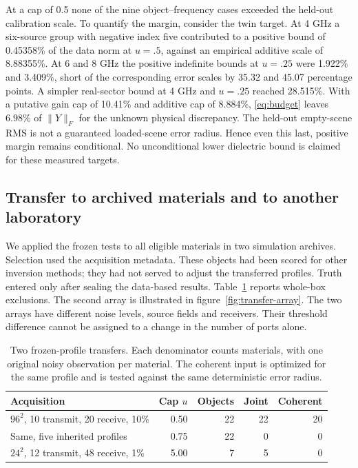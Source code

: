\documentclass[anonymous,12pt]{iopjournal}
\theoremstyle{remark}\newtheorem{remark}[theorem]{Remark}
\numberwithin{equation}{section}
\begin{document}
At a cap of 0.5 none of the nine object--frequency cases exceeded the held-out calibration scale. To quantify the margin, consider the twin target. At 4 GHz a six-source group with negative index five contributed to a positive bound of 0.45358\% of the data norm at $u=.5$, against an empirical additive scale of 8.88355\%. At 6 and 8 GHz the positive indefinite bounds at $u=.25$ were 1.922\% and 3.409\%, short of the corresponding error scales by 35.32 and 45.07 percentage points. A simpler real-sector bound at 4 GHz and $u=.25$ reached 28.515\%. With a putative gain cap of 10.41\% and additive cap of 8.884\%, \eqref{eq:budget} leaves 6.98\% of $\|Y\|_F$ for the unknown physical discrepancy. The held-out empty-scene RMS is not a guaranteed loaded-scene error radius. Hence even this last, positive margin remains conditional. No unconditional lower dielectric bound is claimed for these measured targets.

\subsection{Transfer to archived materials and to another laboratory}
We applied the frozen tests to all eligible materials in two simulation archives. Selection used the acquisition metadata. These objects had been scored for other inversion methods; they had not served to adjust the transferred profiles. Truth entered only after sealing the data-based results. Table~\ref{tab:transfer} reports whole-box exclusions. The second array is illustrated in figure~\ref{fig:transfer-array}. The two arrays have different noise levels, source fields and receivers. Their threshold difference cannot be assigned to a change in the number of ports alone.

\begin{table}[tbp]
\centering\small
\caption{Two frozen-profile transfers. Each denominator counts materials, with one original noisy observation per material. The coherent input is optimized for the same profile and is tested against the same deterministic error radius.}
\label{tab:transfer}
\begin{tabular}{lrrrr}
\toprule
Acquisition & Cap $u$ & Objects & Joint & Coherent\\
\midrule
$96^2$, 10 transmit, 20 receive, 10\% & 0.50 & 22 & 22 & 20\\
Same, five inherited profiles & 0.75 & 22 & 0 & 0\\
$24^2$, 12 transmit, 48 receive, 1\% & 5.00 & 7 & 5 & 0\\
\bottomrule
\end{tabular}
\end{table}
\end{document}
